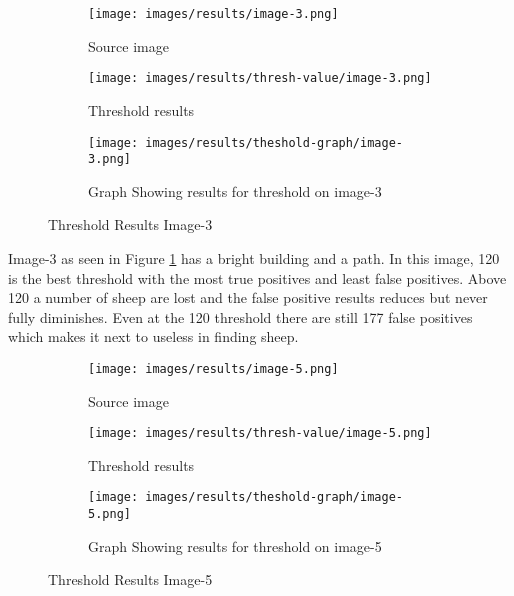 \begin{figure}[H]
    \centering

\begin{subfigure}{.5\textwidth}
    \centering
    \texttt{[image: images/results/image-3.png]}
    \caption{Source image}

\end{subfigure}%
\begin{subfigure}{.5\textwidth}
\centering
    \texttt{[image: images/results/thresh-value/image-3.png]}
    \caption{Threshold results}

\end{subfigure}
\begin{subfigure}{.9\textwidth}
\centering
    \texttt{[image: images/results/theshold-graph/image-3.png]}
    \caption{Graph Showing results for threshold on image-3}
\end{subfigure}%

    \caption{Threshold Results Image-3}
    \label{fig:Threshold-Results-Image-3}
\end{figure}

Image-3 as seen in Figure \ref{fig:Threshold-Results-Image-3} has a bright building and a path. In this image,
120 is the best threshold with the most true positives and least false positives. Above 120 a number of sheep are lost and the false positive results reduces but never fully diminishes. Even at the 120 threshold there  are still 177 false positives which makes it next to useless in finding sheep.

\begin{figure}[H]
    \centering

\begin{subfigure}{.5\textwidth}
    \centering
    \texttt{[image: images/results/image-5.png]}
    \caption{Source image}

\end{subfigure}%
\begin{subfigure}{.5\textwidth}
\centering
    \texttt{[image: images/results/thresh-value/image-5.png]}
    \caption{Threshold results}

\end{subfigure}
\begin{subfigure}{.9\textwidth}
\centering
    \texttt{[image: images/results/theshold-graph/image-5.png]}
    \caption{Graph Showing results for threshold on image-5}
\end{subfigure}%

    \caption{Threshold Results Image-5}
    \label{fig:Threshold-Results-Image-5}
\end{figure}

